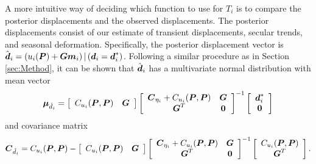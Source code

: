 \documentclass[extra,mreferee]{gji}
\begin{document}

A more intuitive way of deciding which function to use for $T_i$ is to
compare the posterior displacements and the observed displacements.
The posterior displacements consist of our estimate of transient
displacements, secular trends, and seasonal deformation. Specifically,
the posterior displacement vector is $\hat{\data}_i = \left(
u_i(\points) + \G\mitbf{m}_i \right) | \left( \data_i = \data_i^*
\right)$. Following a similar procedure as in Section
\ref{sec:Method}, it can be shown that $\hat{\data}_i$ has a
multivariate normal distribution with mean vector
\begin{equation}\label{eq:DataPredMean}
\mitbf{\mu}_{\hat{d}_i} = \left[\begin{array}{cc}
                          C_{u_i}(\points,\points) & \G \\
                          \end{array}\right]
                          \left[\begin{array}{cc}
                          \mitbf{C}_{\eta_i} + C_{u_i}(\points,\points) & \G \\
                          \G^T  & \zeros \\
                          \end{array}\right]^{-1}
                          \left[\begin{array}{c}
                          \data_i^* \\
                          \zeros \\
                          \end{array}\right]
\end{equation}  
and covariance matrix
\begin{equation}\label{eq:DataPredCov}
\mitbf{C}_{\hat{d}_i} = C_{u_i}(\points,\points) - 
                        \left[\begin{array}{cc}
                              C_{u_i}(\points,\points) & \G \\
                              \end{array}\right]
                        \left[\begin{array}{cc}
                              \mitbf{C}_{\eta_i} + C_{u_i}(\points,\points) & \G \\
                              \G^T  & \zeros \\
                              \end{array}\right]^{-1}
                        \left[\begin{array}{c}
                              C_{u_i}(\points,\points) \\
                              \G^T \\
                              \end{array}\right].
\end{equation}
\end{document}
